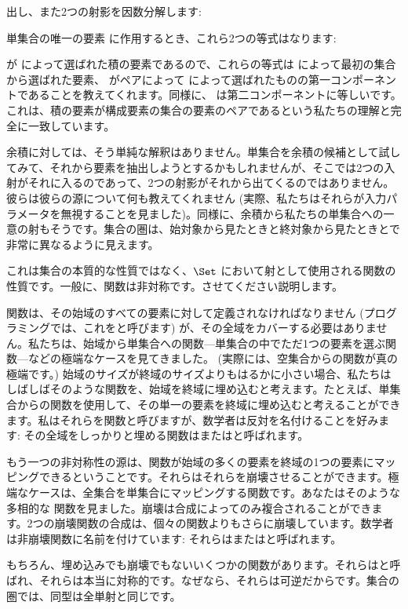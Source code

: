 出し、また2つの射影を因数分解します: 

単集合の唯一の要素 \code{()} に作用するとき、これら2つの等式はなります: 

 が  によって選ばれた積の要素であるので、これらの等式は  によって最初の集合から選ばれた要素、 がペアによって  によって選ばれたものの第一コンポーネントであることを教えてくれます。同様に、 は第二コンポーネントに等しいです。これは、積の要素が構成要素の集合の要素のペアであるという私たちの理解と完全に一致しています。

余積に対しては、そう単純な解釈はありません。単集合を余積の候補として試してみて、それから要素を抽出しようとするかもしれませんが、そこでは2つの入射がそれに入るのであって、2つの射影がそれから出てくるのではありません。彼らは彼らの源について何も教えてくれません (実際、私たちはそれらが入力パラメータを無視することを見ました)。同様に、余積から私たちの単集合への一意の射もそうです。集合の圏は、始対象から見たときと終対象から見たときとで非常に異なるように見えます。

これは集合の本質的な性質ではなく、$\Set$ において射として使用される関数の性質です。一般に、関数は非対称です。させてください説明します。

関数は、その始域のすべての要素に対して定義されなければなりません (プログラミングでは、これをと呼びます) が、その全域をカバーする必要はありません。私たちは、始域から単集合への関数---単集合の中でただ1つの要素を選ぶ関数---などの極端なケースを見てきました。 (実際には、空集合からの関数が真の極端です。) 始域のサイズが終域のサイズよりもはるかに小さい場合、私たちはしばしばそのような関数を、始域を終域に埋め込むと考えます。たとえば、単集合からの関数を使用して、その単一の要素を終域に埋め込むと考えることができます。私はそれらを関数と呼びますが、数学者は反対を名付けることを好みます: その全域をしっかりと埋める関数はまたはと呼ばれます。

もう一つの非対称性の源は、関数が始域の多くの要素を終域の1つの要素にマッピングできるということです。それらはそれらを崩壊させることができます。極端なケースは、全集合を単集合にマッピングする関数です。あなたはそのような多相的な  関数を見ました。崩壊は合成によってのみ複合されることができます。2つの崩壊関数の合成は、個々の関数よりもさらに崩壊しています。数学者は非崩壊関数に名前を付けています: それらはまたはと呼ばれます。

もちろん、埋め込みでも崩壊でもないいくつかの関数があります。それらはと呼ばれ、それらは本当に対称的です。なぜなら、それらは可逆だからです。集合の圏では、同型は全単射と同じです。

